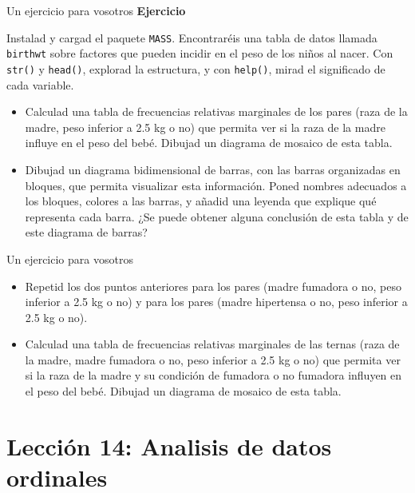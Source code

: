 \documentclass[
  ignorenonframetext,
  aspectratio=169]{beamer}
\begin{document}
\begin{frame}[fragile]{Un ejercicio para vosotros}
\label{un-ejercicio-para-vosotros}
\textbf{Ejercicio}

Instalad y cargad el paquete \texttt{MASS}. Encontraréis una tabla de
datos llamada \texttt{birthwt} sobre factores que pueden incidir en el
peso de los niños al nacer. Con \texttt{str()} y \texttt{head()},
explorad la estructura, y con \texttt{help()}, mirad el significado de
cada variable.

\begin{itemize}
\item
  Calculad una tabla de frecuencias relativas marginales de los pares
  (raza de la madre, peso inferior a 2.5 kg o no) que permita ver si la
  raza de la madre influye en el peso del bebé. Dibujad un diagrama de
  mosaico de esta tabla.
\item
  Dibujad un diagrama bidimensional de barras, con las barras
  organizadas en bloques, que permita visualizar esta información. Poned
  nombres adecuados a los bloques, colores a las barras, y añadid una
  leyenda que explique qué representa cada barra. ¿Se puede obtener
  alguna conclusión de esta tabla y de este diagrama de barras?
\end{itemize}
\end{frame}

\begin{frame}{Un ejercicio para vosotros}
\label{un-ejercicio-para-vosotros-1}
\begin{itemize}
\item
  Repetid los dos puntos anteriores para los pares (madre fumadora o no,
  peso inferior a 2.5 kg o no) y para los pares (madre hipertensa o no,
  peso inferior a 2.5 kg o no).
\item
  Calculad una tabla de frecuencias relativas marginales de las ternas
  (raza de la madre, madre fumadora o no, peso inferior a 2.5 kg o no)
  que permita ver si la raza de la madre y su condición de fumadora o no
  fumadora influyen en el peso del bebé. Dibujad un diagrama de mosaico
  de esta tabla.
\end{itemize}
\end{frame}

\section{Lección 14: Analisis de datos
ordinales}\label{lecciuxf3n-14-analisis-de-datos-ordinales}
\end{document}
